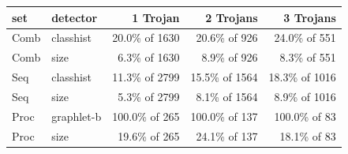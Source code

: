 \begin{tabular}{@{}llrrr@{}}
\toprule
set & detector & 1 Trojan & 2 Trojans & 3 Trojans \\
\midrule
Comb & classhist & 20.0\% of 1630 & 20.6\% of 926 & 24.0\% of 551 \\
Comb & size & 6.3\% of 1630 & 8.9\% of 926 & 8.3\% of 551 \\
\midrule
Seq & classhist & 11.3\% of 2799 & 15.5\% of 1564 & 18.3\% of 1016 \\
Seq & size & 5.3\% of 2799 & 8.1\% of 1564 & 8.9\% of 1016 \\
\midrule
Proc & graphlet-b & 100.0\% of 265 & 100.0\% of 137 & 100.0\% of 83 \\
Proc & size & 19.6\% of 265 & 24.1\% of 137 & 18.1\% of 83 \\
\bottomrule
\end{tabular}
